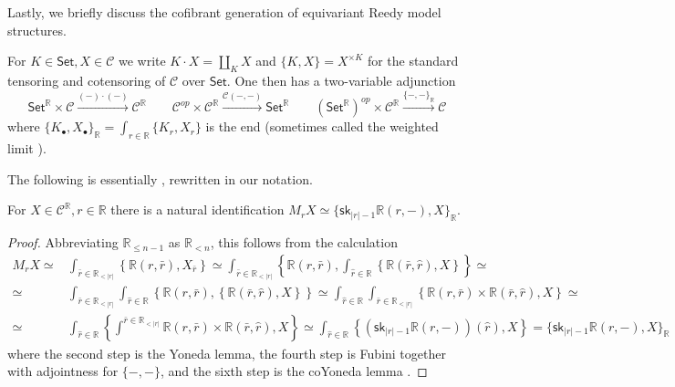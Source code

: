 \documentclass[a4paper,10pt
 ,draft
]{article}%
\begin{document}
Lastly, we briefly discuss the cofibrant generation of equivariant Reedy model structures.

For $K\in \mathsf{Set}, X \in \mathcal{C}$ we write
$K \cdot X = \coprod_K X$ and
$\{K,X\}=X^{\times K}$ for the standard tensoring and cotensoring of $\mathcal{C}$ over $\mathsf{Set}$. One then has a two-variable adjunction
\[
	\mathsf{Set}^{\mathbb{R}} \times \mathcal{C}
	\xrightarrow{(-)\cdot(-)}
	\mathcal{C}^{\mathbb{R}}
\qquad
	\mathcal{C}^{op} \times  \mathcal{C}^{\mathbb{R}}
	\xrightarrow{\mathcal{C}(-,-)}
	\mathsf{Set}^{\mathbb{R}}
\qquad
	\left(\mathsf{Set}^{\mathbb{R}}\right)^{op} \times \mathcal{C}^{\mathbb{R}}
	\xrightarrow{\{-,-\}_{\mathbb{R}}}
	\mathcal{C}
\]
where 
$\{K_{\bullet},X_{\bullet}\}_{\mathbb{R}} =
 \int_{r \in \mathbb{R}} \{K_r,X_r\}$
 is the end (sometimes called the weighted limit \cite[\S 7.1]{Ri14}).



The following is essentially \cite[Lemma 3.5]{RV14}, rewritten in our notation.


\begin{lemma} For $X \in \mathcal{C}^{\mathbb{R}}, r \in \mathbb{R}$ there is a natural identification
$
M_r X \simeq \{\mathsf{sk}_{|r|-1} \mathbb{R}(r,-),X \}_{\mathbb{R}}
$.
\end{lemma}

\begin{proof}
Abbreviating $\mathbb{R}_{\leq n-1}$ as $\mathbb{R}_{<n}$, this follows from the calculation
\begin{align}
	M_r X 
\simeq &
	\int_{\bar{r} \in \mathbb{R}_{<|r|}} 
\left\{\mathbb{R}(r,\bar{r}),X_{\bar{r}}\right\}
\simeq
	\int_{\bar{r} \in \mathbb{R}_{<|r|}} 
\left\{\mathbb{R}(r,\bar{r}),
	\int_{\hat{r} \in \mathbb{R}} \left\{\mathbb{R}(\bar{r},\hat{r}) ,X \right\}\right\}\simeq
\\
\simeq&
	\int_{\bar{r} \in \mathbb{R}_{<|r|}} \int_{\hat{r} \in \mathbb{R}}
\left\{\mathbb{R}(r,\bar{r}),
	\left\{\mathbb{R}(\bar{r},\hat{r}) ,X \right\}\right\}
\simeq
	\int_{\hat{r} \in \mathbb{R}} \int_{\bar{r} \in \mathbb{R}_{<|r|}}
\left\{\mathbb{R}(r,\bar{r})\times \mathbb{R}(\bar{r},\hat{r}) ,X \right\}\simeq
\\
\simeq &
	\int_{\hat{r} \in \mathbb{R}} 
\left\{\int^{\bar{r} \in \mathbb{R}_{<|r|}}\mathbb{R}(r,\bar{r})\times \mathbb{R}(\bar{r},\hat{r}) ,X \right\}
\simeq
	\int_{\hat{r} \in \mathbb{R}} 
\left\{\left(\mathsf{sk}_{|r|-1} \mathbb{R}(r,-)\right)(\hat{r}) ,X \right\} =
\{\mathsf{sk}_{|r|-1} \mathbb{R}(r,-),X \}_{\mathbb{R}} 
\end{align}
where the second step is the Yoneda lemma, the fourth step is Fubini together with adjointness for $\{-,-\}$, and the sixth step is the coYoneda lemma \cite[Ex. 1.4.6]{Ri14}.
\end{proof}
\end{document}
